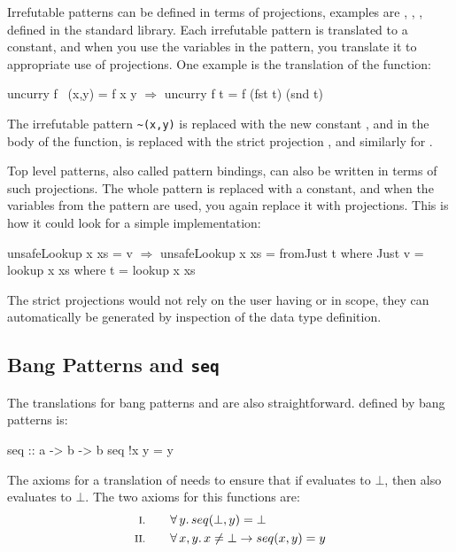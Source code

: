 Irrefutable patterns can be defined in terms of projections, examples
are , , ,  defined in the
standard library. Each irrefutable pattern is translated to a
constant, and when you use the variables in the pattern, you translate
it to appropriate use of projections. One example is the translation
of the  function:

\begin{code}[mathescape]
uncurry f ~(x,y) = f x y        $\Rightarrow$      uncurry f t = f (fst t) (snd t)
\end{code}

\noindent
The irrefutable pattern \verb:~(x,y): is replaced with the new constant
, and in the body of the function,  is replaced with the
strict projection , and similarly for .

Top level patterns, also called pattern bindings, can
also be written in terms of such projections. The whole pattern
is replaced with a constant, and when the variables from the pattern
are used, you again replace it with projections. This is how it
could look for a simple  implementation:

\begin{code}[mathescape]
unsafeLookup x xs = v           $\Rightarrow$      unsafeLookup x xs = fromJust t
  where Just v = lookup x xs            where t = lookup x xs
\end{code}

The strict projections would not rely on the user having  or
 in scope, they can automatically be generated by
inspection of the data type definition.

\subsection{Bang Patterns and \texttt{seq}}

The translations for bang patterns and  are also
straightforward.  defined by bang patterns is:

\begin{code}
seq :: a -> b -> b
seq !x y = y
\end{code}

The axioms for a translation of  needs to ensure that if
 evaluates to $\bot$, then  also evaluates to
$\bot$. The two axioms for this functions are:
\begin{align*}
\rom{1} \qquad & \fa{y}    seq(\bot,y) \eq \bot \\
\rom{2} \qquad & \faa{x}{y} x \neq \bot \rightarrow seq(x,y) \eq y
\end{align*}

